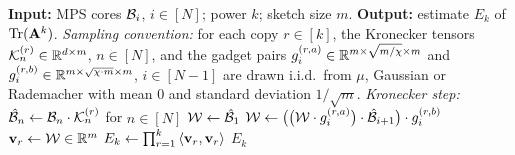 \documentclass[11pt]{article}
\theoremstyle{plain}
\theoremstyle{definition}
\theoremstyle{remark}
\begin{document}
\begin{algorithm}[H]
\caption{Sketched estimation of $\trace(\matA^{k})$ (MPS)}
\label{alg:mps}
\begin{algorithmic}[1]
\STATE \textbf{Input:} MPS cores $\mathcal{B}_i$, $i\in[N]$; power $k$; sketch size $m$.
\STATE \textbf{Output:} estimate $E_k$ of $\trace(\matA^{k})$.
\STATE \emph{Sampling convention:} for each copy $r\in[k]$, the Kronecker tensors $\mathcal{K}_n^{(r)}\in\mathbb{R}^{d\times m}$, $n\in[N]$, and the gadget pairs 
$g_{i}^{(r,a)}\in\mathbb{R}^{m\times\sqrt{m/\chi}\times m}$ and
$g_{i}^{(r,b)}\in\mathbb{R}^{m\times \sqrt{\chi \cdot m}\times m}$, $i\in[N-1]$ are drawn i.i.d.\ from $\mu$, Gaussian or Rademacher with mean $0$ and standard deviation $1/\sqrt{m}$.
  \STATE \emph{Kronecker step:} $\hat{\mathcal{B}}_{n}\gets\mathcal{B}_{n}\cdot\mathcal{K}_{n}^{(r)}$ for $n\in[N]$
  \STATE $\mathcal{W}\gets\hat{\mathcal{B}}_{1}$
    \STATE $\mathcal{W}\gets\bigl(\bigl(\mathcal{W}\cdot g_{i}^{(r,a)}\bigr)\cdot\hat{\mathcal{B}}_{i+1}\bigr)\cdot g_{i}^{(r,b)}$
  \ENDFOR
  \STATE $\mathbf{\boldsymbol{v}}_{r}\gets\mathcal{W}\in\mathbb{R}^{m}$
\ENDFOR
\STATE $E_k\gets\prod_{r=1}^{k}\left\langle \mathbf{\boldsymbol{v}}_r,\mathbf{\boldsymbol{v}}_r \right\rangle$
\RETURN $E_k$
\end{algorithmic}
\end{algorithm}
\end{document}
